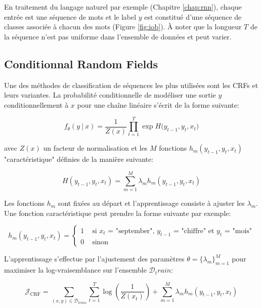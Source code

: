 En traitement du langage naturel par exemple (Chapitre \ref{chap:rnn}), chaque
entrée est une séquence de mots et le label $y$ est constitué d'une séquence de
classes associée à chacun des mots (Figure \ref{fig:iob}). À noter que la
longueur $T$ de la séquence n'est pas uniforme dans l'ensemble de données et
peut varier.

\subsection{Conditionnal Random Fields}

Une des méthodes de classification de séquences les plus utilisées sont les CRFs \citep{rnn6} et leurs variantes.
La probabilité conditionnelle de modéliser une sortie $y$ conditionnellement à
$x$ pour une chaîne linéaire s'écrit de la forme suivante:

\begin{equation}
f_{\theta}(y~\vert~x) = \frac{1}{Z(x)}\prod_{t=1}^{T}\exp{H(y_{t-1}, y_{t}, x_{t}})
\end{equation}

avec $Z(x)$ un facteur de normalisation et les $M$ fonctions $h_{m}(y_{t-1},
y_{t}, x_{t})$ "caractéristique" définies de la manière suivante:

\begin{equation}
H(y_{t-1}, y_{t}, x_{t}) = \sum_{m=1}^{M}\lambda_{m}h_{m}(y_{t-1}, y_{t}, x_{t})
\end{equation}

Les fonctions $h_{m}$ sont fixées au départ et l'apprentissage consiste à
ajuster les $\lambda_{m}$. Une fonction caractéristique peut prendre la forme
suivante par exemple:

\begin{equation}
h_{m}(y_{t-1}, y_{t}, x_{t}) = 
\left\{
\begin{split}
1 &  \textrm{~si $x_{t}$ = "september", $y_{t-1}$ = "chiffre" et $y_{t}$ = "mois"} \\ 
0 & \textrm{~sinon}
\end{split}
\right.
\end{equation}

L'apprentissage s'effectue par l'ajustement des paramètres $\theta=\lbrace \lambda_m \rbrace_{m=1}^{M}$ pour maximiser la log-vraisemblance sur l'ensemble $\mathcal{D}_train$:

\begin{equation}
\mathcal{J}_{\textrm{CRF}} =\sum_{(x,y)\in\mathcal{D}_{train}} \sum_{t=1}^{T} \log (\dfrac{1}{Z(x_{t})}) + \sum_{m=1}^{M} \lambda_{m} h_{m}(y_{t-1}, y_{t}, x_{t})
\label{eq:loglikecrf}
\end{equation}

